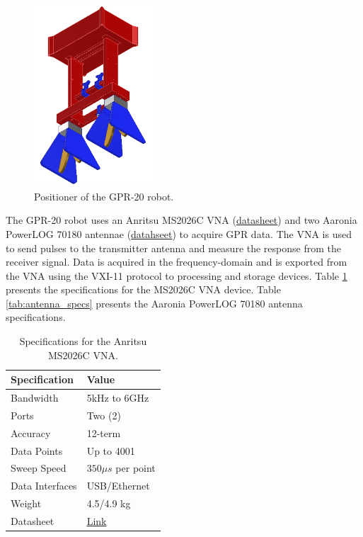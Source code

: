 \documentclass{article}
\begin{document}
\begin{figure}[h]
    \centering
    \includegraphics[width=0.4\textwidth]{images/implementation/positioner_a.png}
    \caption{Positioner of the GPR-20 robot.}
    \label{fig:positioner}
\end{figure}

The GPR-20 robot uses an Anritsu MS2026C VNA (\href{https://dl.cdn-anritsu.com/en-us/test-measurement/files/Brochures-Datasheets-Catalogs/datasheet/11410-00548AM.pdf}{datasheet}) and two Aaronia PowerLOG 70180 antennae (\href{https://downloads.aaronia.com/datasheets/antennas/PowerLOG/Aaronia_PowerLOG_Horn_Antennas.pdf##}{datahseet}) to acquire GPR data. The VNA is used to send pulses to the transmitter antenna and measure the response from the receiver signal. Data is acquired in the frequency-domain and is exported from the VNA using the VXI-11 protocol to processing and storage devices. Table \ref{tab:vna_specs} presents the specifications for the MS2026C VNA device. Table \ref{tab:antenna_specs} presents the Aaronia PowerLOG 70180 antenna specifications.

\begin{table}[h]
    \centering
    \begin{tabular}{|l|l|}
        \hline \textbf{Specification} & \textbf{Value} \\ \hline
        Bandwidth & 5kHz to 6GHz \\ \hline
        Ports & Two (2) \\ \hline
        Accuracy & 12-term \\ \hline
        Data Points & Up to 4001 \\ \hline
        Sweep Speed & $350 \mu s$ per point \\ \hline
        Data Interfaces & USB/Ethernet \\ \hline
        Weight & 4.5/4.9 kg \\ \hline
        Datasheet & \href{https://dl.cdn-anritsu.com/en-us/test-measurement/files/Brochures-Datasheets-Catalogs/datasheet/11410-00548AM.pdf}{Link} \\ \hline
    \end{tabular}
    \caption{Specifications for the Anritsu MS2026C VNA.}
    \label{tab:vna_specs}
\end{table}
\end{document}
